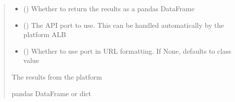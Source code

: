 \documentclass[letterpaper,10pt,english]{sphinxmanual}
\begin{document}
\begin{fulllineitems}
\begin{fulllineitems}
\begin{quote}
\begin{description}
\begin{itemize}
\item {} 
\sphinxAtStartPar
{} (\sphinxstyleliteralemphasis{\sphinxupquote{ (}}\sphinxstyleliteralemphasis{\sphinxupquote{)}}) \textendash{} Whether to return the results as a pandas DataFrame

\item {} 
\sphinxAtStartPar
{} (\sphinxstyleliteralemphasis{\sphinxupquote{ (}}\sphinxstyleliteralemphasis{\sphinxupquote{)}}) \textendash{} The API port to use. This can be handled automatically by the platform ALB

\item {} 
\sphinxAtStartPar
{} (\sphinxstyleliteralemphasis{\sphinxupquote{ (}}\sphinxstyleliteralemphasis{\sphinxupquote{)}}) \textendash{} Whether to use port in URL formatting. If None, defaults to class value

\end{itemize}

\sphinxAtStartPar
{} \textendash{} The results from the platform

\sphinxAtStartPar
pandas DataFrame or dict

\end{description}\end{quote}

\end{fulllineitems}



\end{fulllineitems}
\end{document}
